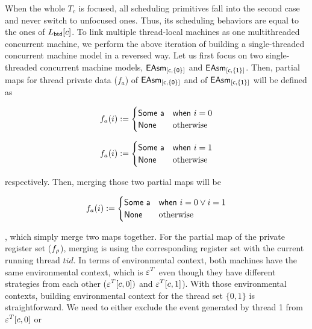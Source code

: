 When the whole $T_c$  is focused,
all scheduling primitives fall into the second case and never switch to unfocused ones. Thus, 
its scheduling behaviors are equal to the ones of $L_{\mathsf{\textcolor{black}{btd}}}[c]$. 
To link multiple thread-local machines as one multithreaded concurrent machine,  
we perform the above iteration of building a single-threaded concurrent machine model in a reversed way.
Let us first focus on two single-threaded concurrent machine models, 
$\mathsf{EAsm_{[c, \{0\}]}}$ and $\mathsf{EAsm_{[c, \{1\}]}}$.
Then, partial maps for thread private data ($f_a$) of $\mathsf{EAsm_{[c, \{0\}]}}$ 
and of $\mathsf{EAsm_{[c, \{1\}]}}$ will be defined as\newline
\noindent
\begin{minipage}[t]{.5\textwidth}
\begin{small}
\[
f_{a}(i):=
\begin{cases}
 \mathsf{\textcolor{black}{Some \ a}} & \mathsf{\textcolor{black}{when}} \ i = 0\\
\mathsf{\textcolor{black}{None}} & \text{otherwise}
\end{cases}
\]
\end{small}
\end{minipage}
\begin{minipage}[t]{.5\textwidth}
\begin{small}
\[
f_{a}(i):=
\begin{cases}
 \mathsf{\textcolor{black}{Some \ a}} & \mathsf{\textcolor{black}{when}} \ i = 1\\
\mathsf{\textcolor{black}{None}} & \text{otherwise}
\end{cases}
\]
\end{small}
\end{minipage}
respectively.
Then, merging those two partial maps will be 
\begin{small}
\[
f_{a}(i):=
\begin{cases}
 \mathsf{\textcolor{black}{Some \ a}} & \mathsf{\textcolor{black}{when}} \ i = 0 \vee i = 1\\
\mathsf{\textcolor{black}{None}} & \text{otherwise}
\end{cases}
\]
\end{small}
, which simply merge two maps together. 
For the partial map of the private register set ($f_\rho$), merging
is using the corresponding register set with the current running thread $tid$.
In terms of environmental context, both machines have the same environmental context, which is 
$\oracle^{T}$ even though they have different strategies from each other ($\oracle^{T}[c, 0])$ and $\oracle^{T}[c, 1]$).
With those environmental contexts, 
building environmental context for the thread set $\{0, 1\}$ is straightforward. 
We need to either  exclude the event generated by thread 1 from $\oracle^{T}[c, 0]$ or 
